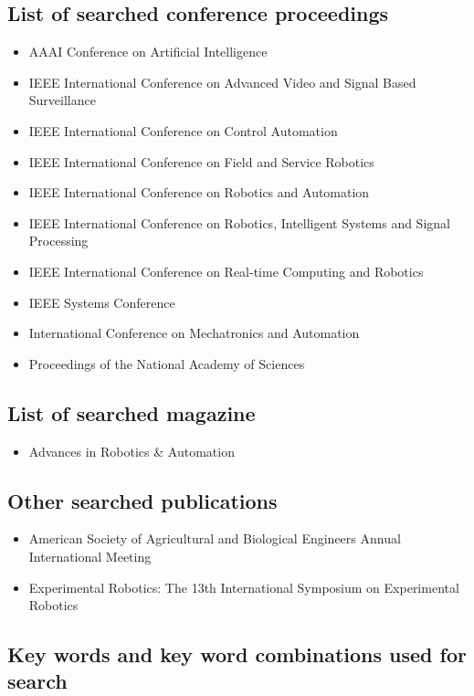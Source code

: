     \subsection{List of searched conference proceedings}
    \begin{itemize}
        \item AAAI Conference on Artificial Intelligence 
        \item IEEE International Conference on Advanced Video and Signal Based Surveillance
        \item IEEE International Conference on Control Automation 
        \item IEEE International Conference on Field and Service Robotics
        \item IEEE International Conference on Robotics and Automation
        \item IEEE International Conference on Robotics, Intelligent Systems and Signal Processing
        \item IEEE International Conference on Real-time Computing and Robotics
        \item IEEE Systems Conference
        \item International Conference on Mechatronics and Automation
        \item Proceedings of the National Academy of Sciences
    \end{itemize}
    \subsection{List of searched magazine}
    \begin{itemize}
        \item Advances in Robotics {\&} Automation
    \end{itemize}
    \subsection{Other searched publications}
    \begin{itemize}
        \item American Society of Agricultural and Biological Engineers Annual International Meeting
        \item Experimental Robotics: The 13th International Symposium on Experimental Robotics
    \end{itemize}
    \subsection{Key words and key word combinations used for search}
    \label{sec:keywords}
   
